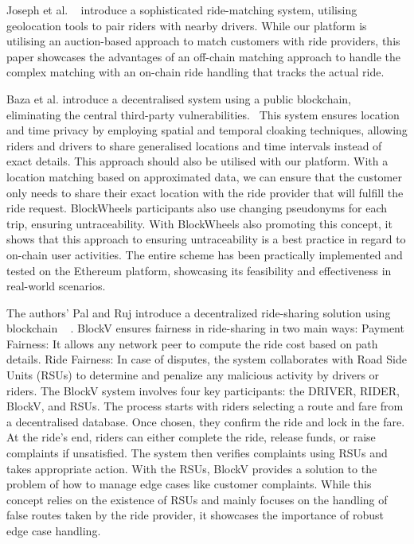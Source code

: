 Joseph et al. ~\cite{Joseph.} introduce a sophisticated ride-matching system, utilising geolocation tools to pair riders with nearby drivers. While our platform is utilising an auction-based approach to match customers with ride providers, this paper showcases the advantages of an off-chain matching approach to handle the complex matching with an on-chain ride handling that tracks the actual ride.

Baza et al. introduce a decentralised system using a public blockchain, eliminating the central third-party vulnerabilities.~\cite{Baza.52520205282020} This system ensures location and time privacy by employing spatial and temporal cloaking techniques, allowing riders and drivers to share generalised locations and time intervals instead of exact details. This approach should also be utilised with our platform. With a location matching based on approximated data, we can ensure that the customer only needs to share their exact location with the ride provider that will fulfill the ride request.
BlockWheels participants also use changing pseudonyms for each trip, ensuring untraceability. With BlockWheels also promoting this concept, it shows that this approach to ensuring untraceability is a best practice in regard to on-chain user activities. The entire scheme has been practically implemented and tested on the Ethereum platform, showcasing its feasibility and effectiveness in real-world scenarios.

The authors' Pal and Ruj introduce a decentralized ride-sharing solution using blockchain ~\cite{Pal.} . BlockV ensures fairness in ride-sharing in two main ways:
Payment Fairness: It allows any network peer to compute the ride cost based on path details.
Ride Fairness: In case of disputes, the system collaborates with Road Side Units (RSUs) to determine and penalize any malicious activity by drivers or riders.
The BlockV system involves four key participants: the DRIVER, RIDER, BlockV, and RSUs. The process starts with riders selecting a route and fare from a decentralised database. Once chosen, they confirm the ride and lock in the fare. At the ride's end, riders can either complete the ride, release funds, or raise complaints if unsatisfied. The system then verifies complaints using RSUs and takes appropriate action.
With the RSUs, BlockV provides a solution to the problem of how to manage edge cases like customer complaints. While this concept relies on the existence of RSUs and mainly focuses on the handling of false routes taken by the ride provider, it showcases the importance of robust edge case handling.

